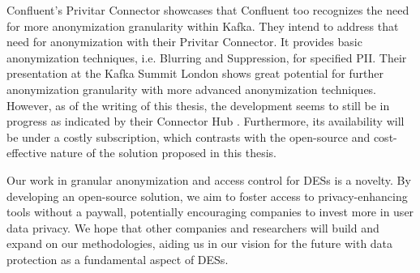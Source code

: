 Confluent's Privitar Connector \cite{privitar} showcases that Confluent too recognizes the need for more anonymization granularity within Kafka. They intend to address that need for anonymization with their Privitar Connector. It provides basic anonymization techniques, i.e. Blurring and Suppression, for specified \ac{PII}. Their presentation at the Kafka Summit London \cite{confluent_privitar_summit} shows great potential for further anonymization granularity with more advanced anonymization techniques. However, as of the writing of this thesis, the development seems to still be in progress as indicated by their Connector Hub \cite{privitar}. Furthermore, its availability will be under a costly subscription, which contrasts with the open-source and cost-effective nature of the solution proposed in this thesis. \par
Our work in granular anonymization and access control for \acp{DES} is a novelty. By developing an open-source solution, we aim to foster access to privacy-enhancing tools without a paywall, potentially encouraging companies to invest more in user data privacy. We hope that other companies and researchers will build and expand on our methodologies, aiding us in our vision for the future with data protection as a fundamental aspect of \acp{DES}. 